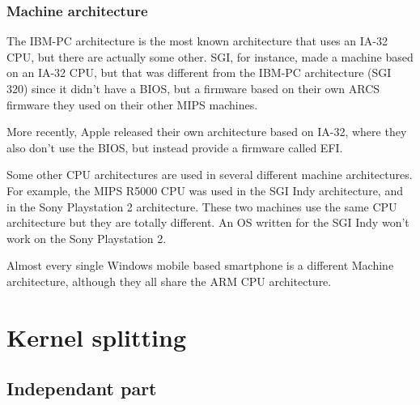 \begin{frame}
  \frametitle{Machine architecture}

  The IBM-PC architecture is the most known architecture that uses an IA-32 CPU, but there are actually some other. SGI, for instance, made a machine based on an IA-32 CPU, but that was different from the IBM-PC architecture (SGI 320) since it didn't have a BIOS, but a firmware based on their own ARCS firmware they used on their other MIPS machines.

  \-

  More recently, Apple released their own architecture based on IA-32, where they also don't use the BIOS, but instead provide a firmware called EFI.

  \-

  Some other CPU architectures are used in several different machine architectures. For example, the MIPS R5000 CPU was used in the SGI Indy architecture, and in the Sony Playstation 2 architecture. These two machines use the same CPU architecture but they are totally different. An OS written for the SGI Indy won't work on the Sony Playstation 2.

  \-

  Almost every single Windows mobile based smartphone is a different Machine architecture, although they all share the ARM CPU architecture.

\end{frame}

\section{Kernel splitting}
\subsection{Independant part}


